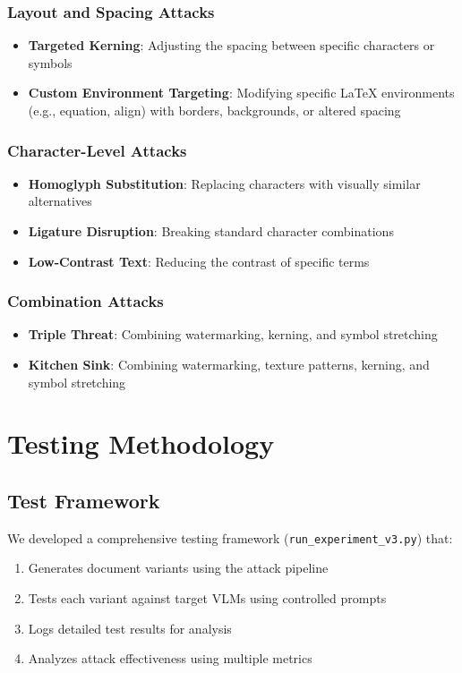 \documentclass[conference]{IEEEtran}
\begin{document}
\subsubsection{Layout and Spacing Attacks}
\begin{itemize}
    \item \textbf{Targeted Kerning}: Adjusting the spacing between specific characters or symbols
    \item \textbf{Custom Environment Targeting}: Modifying specific LaTeX environments (e.g., equation, align) with borders, backgrounds, or altered spacing
\end{itemize}

\subsubsection{Character-Level Attacks}
\begin{itemize}
    \item \textbf{Homoglyph Substitution}: Replacing characters with visually similar alternatives
    \item \textbf{Ligature Disruption}: Breaking standard character combinations
    \item \textbf{Low-Contrast Text}: Reducing the contrast of specific terms
\end{itemize}

\subsubsection{Combination Attacks}
\begin{itemize}
    \item \textbf{Triple Threat}: Combining watermarking, kerning, and symbol stretching
    \item \textbf{Kitchen Sink}: Combining watermarking, texture patterns, kerning, and symbol stretching
\end{itemize}

\section{Testing Methodology}
\subsection{Test Framework}
We developed a comprehensive testing framework (\texttt{run\_experiment\_v3.py}) that:
\begin{enumerate}
    \item Generates document variants using the attack pipeline
    \item Tests each variant against target VLMs using controlled prompts
    \item Logs detailed test results for analysis
    \item Analyzes attack effectiveness using multiple metrics
\end{enumerate}
\end{document}
